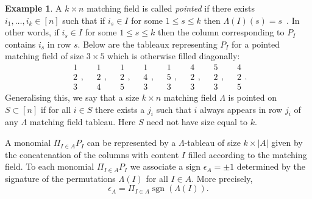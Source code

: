 \documentclass[10pt]{amsart}
\theoremstyle{definition}
\newtheorem{exam}[theo]{Example}
\DeclareMathOperator{\sgn}{sgn}
\begin{document}
\begin{exam}\label{ex:pointed1}
A $k \times n$ matching field is called \emph{pointed} if there exists $i_1, \ldots, i_k \in [n]$ such that if $i_s \in I$ for some 
$1 \leq s \leq k$ then $\Lambda(I)(s) = s$~\cite[Example~1.4]{sturmfels1993maximal}. In other words, if $i_s \in I$ for some $1\leq s \leq k$ then the column corresponding to $P_I$ contains $i_s$ in row $s$. Below are the tableaux representing $P_I$ for a pointed matching field of size $3 \times 5$ which is otherwise filled diagonally:
\[
\begin{array}{c}1 \\2 \\ 3 \end{array} , \quad
\begin{array}{c} 1 \\2 \\4 \end{array},\quad
\begin{array}{c}1 \\2 \\ 5 \end{array} , \quad
\begin{array}{c}1 \\ 4 \\ 3 \end{array} ,\quad
\begin{array}{c}1 \\5 \\ 3\end{array} ,\quad
\begin{array}{c}4 \\ 2\\ 3 \end{array} ,\quad
\begin{array}{c}5 \\2 \\ 3\end{array} ,\quad
\begin{array}{c} 4 \\ 2 \\ 5 \end{array}. 
\]
Generalising this, we say that a size $k \times n$ matching field $\Lambda$ is pointed on $S \subset [n]$ if for all $i \in S$ there exists a $j_i$ such that $i$ always appears in row $j_i$ of any $\Lambda$ matching field tableau. 
Here $S$ need not have size equal to $k$. 
\end{exam}


A monomial $\Pi_{I \in A} P_I $ can be represented by a $\Lambda$-tableau of size $k \times |A|$ given by the concatenation of the columns with content $I$ filled according to the matching field. 
To each monomial $\Pi_{I \in A} P_I $ we associate a sign $\epsilon_{A} = \pm 1$ determined by the signature of the permutations $\Lambda(I)$ for all $I \in A$. More precisely, 
\[
\epsilon_{A} = \Pi_{I \in A} \sgn (\Lambda(I)).
\]
\end{document}
